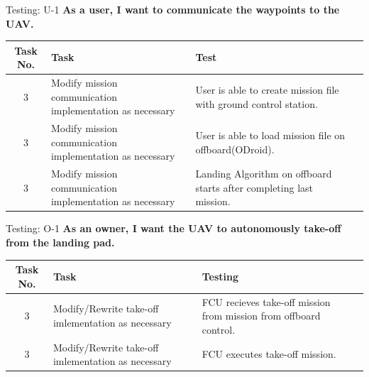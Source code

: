 \documentclass[11pt]{beamer}
\begin{document}



\begin{frame}{Testing: U-1}
\textbf{As a user, I want to communicate the waypoints to the UAV.}
\begin{tabular}{| c | >{\raggedright}m{4cm} | m{4cm} | c |}\hline
	Task No. & Task & Test\\\hline
	3 & Modify mission communication implementation as necessary & User is able to create mission file with ground control station.\\\hline
	3 & Modify mission communication implementation as necessary & User is able to load mission file on offboard(ODroid).\\\hline
	3 & Modify mission communication implementation as necessary & Landing Algorithm on offboard starts after completing last mission.\\\hline
	
\end{tabular}

\end{frame}
\begin{frame}{Testing: O-1}
\textbf{As an owner, I want the UAV to autonomously take-off from the landing pad.}
\begin{tabular}{| c | >{\raggedright}m{4cm} | m{4cm} | c |}\hline
	Task No. & Task & Testing\\\hline
	3 & Modify/Rewrite take-off imlementation as necessary
 & FCU recieves take-off mission from mission from offboard control.\\\hline	
	3 & Modify/Rewrite take-off imlementation as necessary
 & FCU executes take-off mission.\\\hline	
\end{tabular}
\end{frame}
\end{document}
